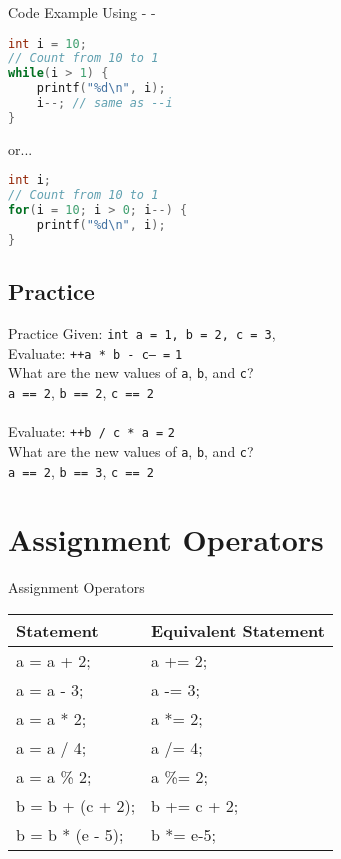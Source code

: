 \documentclass[graphics]{beamer}
\begin{document}
\begin{frame}[fragile]{Code Example Using - -}
    \begin{lstlisting}[language=C,basicstyle=\footnotesize,keywordstyle=\color{blue},commentstyle=\color{green},showstringspaces=false,stringstyle=\color{red}]
int i = 10;
// Count from 10 to 1
while(i > 1) {
    printf("%d\n", i);
    i--; // same as --i
}
\end{lstlisting}
or...
    \begin{lstlisting}[language=C,basicstyle=\footnotesize,keywordstyle=\color{blue},commentstyle=\color{green},showstringspaces=false,stringstyle=\color{red}]
int i;
// Count from 10 to 1
for(i = 10; i > 0; i--) {
    printf("%d\n", i);
}
\end{lstlisting}
\end{frame}

\subsection{Practice}
\begin{frame}{Practice}
    Given: \texttt{int a = 1, b = 2, c = 3}, \\
    Evaluate: \texttt{++a * b - c-- =} 
    \pause
    \texttt{1} \\ What are the new values of \texttt{a}, \texttt{b}, and \texttt{c}? \\
    \pause
    \texttt{a == 2}, \texttt{b == 2}, \texttt{c == 2} \\ ~~ \\
    \pause
    Evaluate: \texttt{++b / c * a =} 
    \pause
    \texttt{2} \\ What are the new values of \texttt{a}, \texttt{b}, and \texttt{c}? \\
    \pause
    \texttt{a == 2}, \texttt{b == 3}, \texttt{c == 2}
\end{frame}

\section{Assignment Operators}
\begin{frame}{Assignment Operators}
    \begin{tabular}{l l}
        Statement & Equivalent Statement \\ \hline
        a = a + 2; & a += 2; \\
        a = a - 3; & a -= 3; \\
        a = a * 2; & a *= 2; \\
        a = a / 4; & a /= 4; \\
        a = a \% 2; & a \%= 2; \\
        b = b + (c + 2); & b += c + 2; \\
        b = b * (e - 5); & b *= e-5;
    \end{tabular}
\end{frame}
\end{document}
